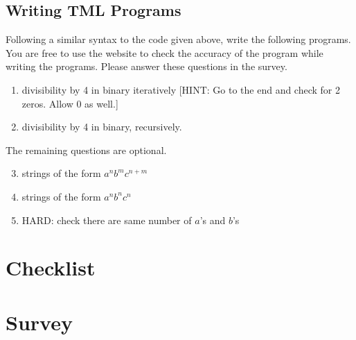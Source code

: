 \begin{appendices}
\subsection{Writing TML Programs}

Following a similar syntax to the code given above, write the following programs. You are free to use the website to check the accuracy of the program while writing the programs. Please answer these questions in the survey.
\begin{enumerate}
    \item divisibility by 4 in binary iteratively [HINT: Go to the end and check for 2 zeros. Allow 0 as well.]
    \item divisibility by 4 in binary, recursively.
\end{enumerate}
    
The remaining questions are optional. 
\begin{enumerate}
    \setcounter{enumi}{2}
    \item strings of the form $a^n b^m c^{n+m}$
    \item strings of the form $a^n b^n c^n$
    \item HARD: check there are same number of $a$'s and $b$'s
\end{enumerate}

\section{Checklist}
\section{Survey}



\end{appendices}